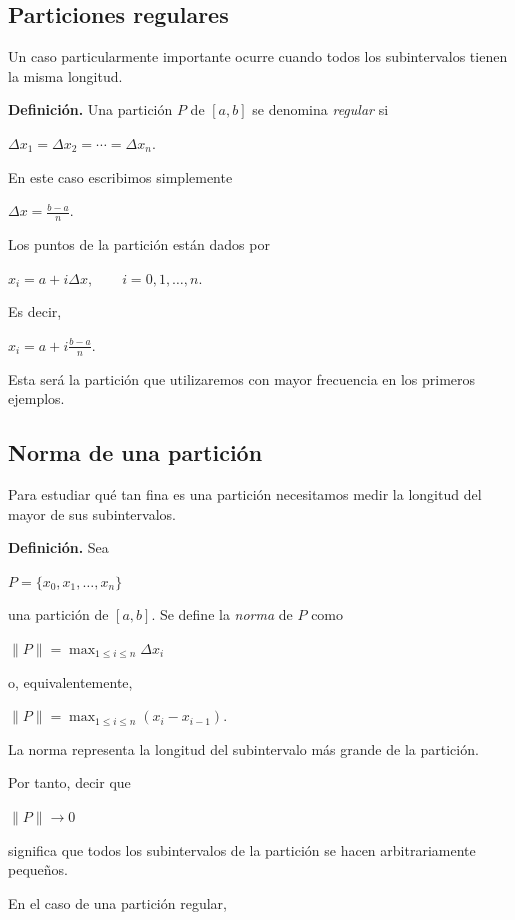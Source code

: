 \documentclass[12pt]{article}
\begin{document}
\subsection*{Particiones regulares}

Un caso particularmente importante ocurre cuando todos los subintervalos
tienen la misma longitud.

\textbf{Definición.}
Una partición $P$ de $[a,b]$ se denomina \emph{regular} si

$
\Delta x_1=\Delta x_2=\cdots=\Delta x_n.
$

En este caso escribimos simplemente

$
\Delta x=\frac{b-a}{n}.
$

Los puntos de la partición están dados por

$
x_i=a+i\Delta x,
\qquad i=0,1,\ldots,n.
$

Es decir,

$
x_i
=
a+i\frac{b-a}{n}.
$

Esta será la partición que utilizaremos con mayor frecuencia en los
primeros ejemplos.

\subsection*{Norma de una partición}

Para estudiar qué tan fina es una partición necesitamos medir la longitud
del mayor de sus subintervalos.

\textbf{Definición.}
Sea

$
P=\{x_0,x_1,\ldots,x_n\}
$

una partición de $[a,b]$. Se define la \emph{norma} de $P$ como

$
\boxed{
\|P\|
=
\max_{1\leq i\leq n}
\Delta x_i
}
$

o, equivalentemente,

$
\|P\|
=
\max_{1\leq i\leq n}
(x_i-x_{i-1}).
$

La norma representa la longitud del subintervalo más grande de la
partición.

Por tanto, decir que

$
\|P\|\longrightarrow0
$

significa que todos los subintervalos de la partición se hacen
arbitrariamente pequeños.

En el caso de una partición regular,
\end{document}
